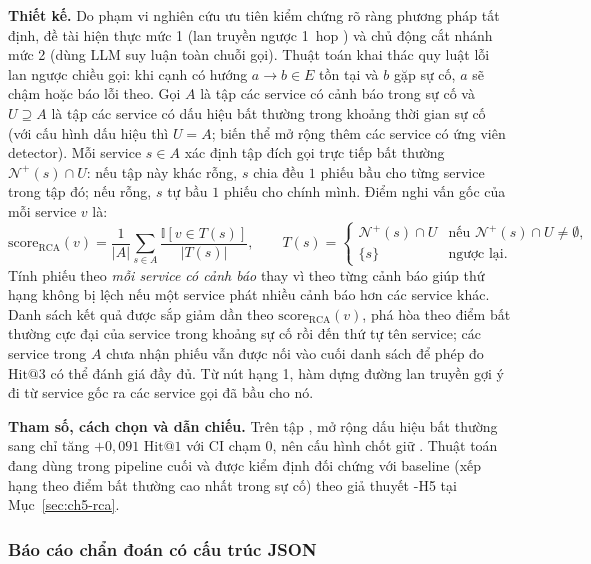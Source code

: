 \textbf{Thiết kế.} Do phạm vi nghiên cứu ưu tiên kiểm chứng rõ ràng phương pháp tất định, đề tài hiện thực mức 1 (lan truyền ngược 1~hop ) và chủ động cắt nhánh mức 2 (dùng LLM suy luận toàn chuỗi gọi). Thuật toán khai thác quy luật lỗi lan ngược chiều gọi: khi cạnh có hướng $a \to b \in E$ tồn tại và $b$ gặp sự cố, $a$ sẽ chậm hoặc báo lỗi theo. Gọi $A$ là tập các service có cảnh báo trong sự cố và $U \supseteq A$ là tập các service có dấu hiệu bất thường trong khoảng thời gian sự cố (với cấu hình dấu hiệu  thì $U = A$; biến thể  mở rộng thêm các service có ứng viên detector). Mỗi service $s \in A$ xác định tập đích gọi trực tiếp bất thường $\mathcal{N}^+(s) \cap U$: nếu tập này khác rỗng, $s$ chia đều $1$ phiếu bầu cho từng service trong tập đó; nếu rỗng, $s$ tự bầu $1$ phiếu cho chính mình. Điểm nghi vấn gốc của mỗi service $v$ là:
\begin{equation}
  \text{score}_{\text{RCA}}(v) = \frac{1}{|A|} \sum_{s \in A} \frac{\mathbb{I}[v \in T(s)]}{|T(s)|},
  \qquad
  T(s) =
  \begin{cases}
    \mathcal{N}^+(s) \cap U & \text{nếu } \mathcal{N}^+(s) \cap U \neq \emptyset, \\
    \{s\} & \text{ngược lại.}
  \end{cases}
  \label{eq:ch4-rca-vote}
\end{equation}
Tính phiếu theo \emph{mỗi service có cảnh báo} thay vì theo từng cảnh báo giúp thứ hạng không bị lệch nếu một service phát nhiều cảnh báo hơn các service khác. Danh sách kết quả được sắp giảm dần theo $\text{score}_{\text{RCA}}(v)$, phá hòa theo điểm bất thường cực đại của service trong khoảng sự cố rồi đến thứ tự tên service; các service trong $A$ chưa nhận phiếu vẫn được nối vào cuối danh sách để phép đo $\text{Hit}@3$ có thể đánh giá đầy đủ. Từ nút hạng 1, hàm  dựng đường lan truyền gợi ý đi từ service gốc ra các service gọi đã bầu cho nó.

\textbf{Tham số, cách chọn và dẫn chiếu.} Trên tập , mở rộng dấu hiệu bất thường sang  chỉ tăng $+0{,}091$ $\text{Hit}@1$ với CI chạm $0$, nên cấu hình chốt giữ . Thuật toán đang dùng trong pipeline cuối và được kiểm định đối chứng với baseline  (xếp hạng theo điểm bất thường cao nhất trong sự cố) theo giả thuyết \hyp{H5} tại Mục~\ref{sec:ch5-rca}.

\subsubsection{Báo cáo chẩn đoán có cấu trúc JSON}
\label{sec:ch4-report}

